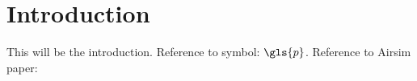 
\chapter{Introduction}

This will be the introduction. Reference to symbol: $\gls{p}$. Reference to Airsim paper: \cite{Airsim_paper}